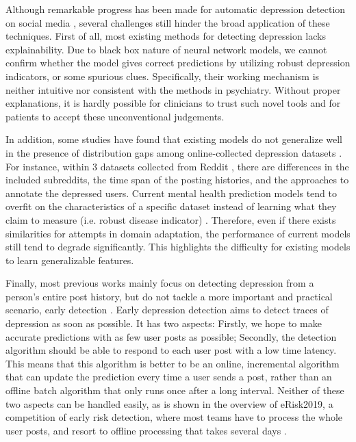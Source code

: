 Although remarkable progress has been made for automatic depression detection on social media \citep{trotzek2018utilizing, gui2019cooperative, zogan2021depressionnet}, several challenges still hinder the broad application of these techniques. First of all, most existing methods for detecting depression lacks explainability. Due to black box nature of neural network models, we cannot confirm whether the model gives correct predictions by utilizing robust depression indicators, or some spurious clues. Specifically, their working mechanism is neither intuitive nor consistent with the methods in psychiatry. Without proper explanations, it is hardly possible for clinicians to trust such novel tools and for patients to accept these unconventional judgements.

In addition, some studies have found that existing models do not generalize well in the presence of distribution gaps among online-collected depression datasets \citep{harrigian2020models}. For instance, within 3 datasets collected from Reddit \citep{losada2016test, yates2017depression, wolohan2018detecting}, there are differences in the included subreddits, the time span of the posting histories, and the approaches to annotate the depressed users.
Current mental health prediction models tend to overfit on the characteristics of a specific dataset instead of learning what they claim to measure (i.e. robust disease indicator) \citep{ernala2019methodological}. Therefore, even if there exists similarities for attempts in domain adaptation, the performance of current models still tend to degrade significantly. This highlights the difficulty for existing models to learn generalizable features. %

Finally, most previous works mainly focus on detecting depression from a person's entire post history, but do not tackle a more important and practical scenario, early detection \citep{losada2017erisk}. Early depression detection aims to detect traces of depression as soon as possible. It has two aspects: Firstly, we hope to make accurate predictions with as few user posts as possible; Secondly, the detection algorithm should be able to respond to each user post with a low time latency. This means that this algorithm is better to be an online, incremental algorithm that can update the prediction every time a user sends a post, rather than an offline batch algorithm that only runs once after a long interval. Neither of these two aspects can be handled easily, as is shown in the overview of eRisk2019, a competition of early risk detection, where most teams have to process the whole user posts, and resort to offline processing that takes several days \citep{losada2019overview}. 


